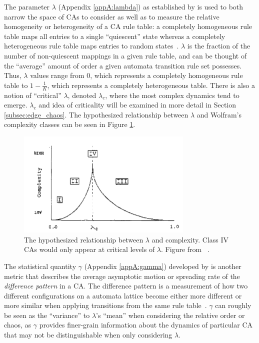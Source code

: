 \documentclass[a4paper,11pt]{report}
\begin{document}
\medskip
The parameter $\lambda$ (Appendix \ref{appA:lambda}) as established by \citeauthor{la90} is used to both narrow the space of CAs to consider as well as to measure the relative homogeneity or heterogeneity of a CA rule table: a completely homogeneous rule table maps all entries to a single ``quiescent'' state whereas a completely heterogeneous rule table maps entries to random states~\cite{la90}. $\lambda$ is the fraction of the number of non-quiescent mappings in a given rule table, and can be thought of the ``average'' amount of order a given automata transition rule set possesses. Thus, $\lambda$ values range from $0$, which represents a completely homogeneous rule table to $1 - \frac{1}{K}$, which represents a completely heterogeneous table. There is also a notion of ``critical'' $\lambda$, denoted $\lambda_c$, where the most complex dynamics tend to emerge. $\lambda_c$ and idea of criticality will be examined in more detail in Section \ref{subsec:edge_chaos}. The hypothesized relationship between $\lambda$ and Wolfram's complexity classes can be seen in Figure \ref{fig:wolfram}.

\begin{figure}[htp]
	\centering
	\includegraphics[width=0.75\textwidth]{la90_fig16_wolfram_classes.png}
	\caption[Wolfram's Complexity Classes]{
	The hypothesized relationship between $\lambda$ and complexity. Class IV CAs would only appear at critical levels of $\lambda$. Figure from \citeauthor{la90}~\cite{la90}.
	}
	\label{fig:wolfram}
\end{figure}

\medskip

The statistical quantity $\gamma$ (Appendix \ref{appA:gamma}) developed by \citeauthor{li90b} is another metric that describes the average asymptotic motion or spreading rate of the \textit{difference pattern} in a CA. The difference pattern is a measurement of how two different configurations on a automata lattice become either more different or more similar when applying transitions from the same rule table~\cite{li90b}. $\gamma$ can roughly be seen as the ``variance'' to $\lambda$'s ``mean'' when considering the relative order or chaos, as $\gamma$ provides finer-grain information about the dynamics of particular CA that may not be distinguishable when only considering $\lambda$.
\end{document}
